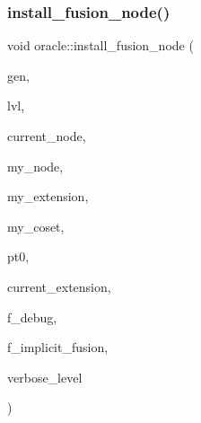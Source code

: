 \mbox{\label{classoracle_a8375f717ccaea657f03f4d03fa68a9a2}} 
\subsubsection{\texorpdfstring{install\+\_\+fusion\+\_\+node()}{install\_fusion\_node()}}
{\footnotesize\ttfamily void oracle\+::install\+\_\+fusion\+\_\+node (\begin{DoxyParamCaption}\item[{\mbox{\hyperlink{classgenerator}{generator}} $\ast$}]{gen,  }\item[{\mbox{\hyperlink{galois_8h_a09fddde158a3a20bd2dcadb609de11dc}{I\+NT}}}]{lvl,  }\item[{\mbox{\hyperlink{galois_8h_a09fddde158a3a20bd2dcadb609de11dc}{I\+NT}}}]{current\+\_\+node,  }\item[{\mbox{\hyperlink{galois_8h_a09fddde158a3a20bd2dcadb609de11dc}{I\+NT}}}]{my\+\_\+node,  }\item[{\mbox{\hyperlink{galois_8h_a09fddde158a3a20bd2dcadb609de11dc}{I\+NT}}}]{my\+\_\+extension,  }\item[{\mbox{\hyperlink{galois_8h_a09fddde158a3a20bd2dcadb609de11dc}{I\+NT}}}]{my\+\_\+coset,  }\item[{\mbox{\hyperlink{galois_8h_a09fddde158a3a20bd2dcadb609de11dc}{I\+NT}}}]{pt0,  }\item[{\mbox{\hyperlink{galois_8h_a09fddde158a3a20bd2dcadb609de11dc}{I\+NT}}}]{current\+\_\+extension,  }\item[{\mbox{\hyperlink{galois_8h_a09fddde158a3a20bd2dcadb609de11dc}{I\+NT}}}]{f\+\_\+debug,  }\item[{\mbox{\hyperlink{galois_8h_a09fddde158a3a20bd2dcadb609de11dc}{I\+NT}}}]{f\+\_\+implicit\+\_\+fusion,  }\item[{\mbox{\hyperlink{galois_8h_a09fddde158a3a20bd2dcadb609de11dc}{I\+NT}}}]{verbose\+\_\+level }\end{DoxyParamCaption})}

\mbox{\label{classoracle_a51f9cd387e52812e9a67f4d9cfcca603}} 
